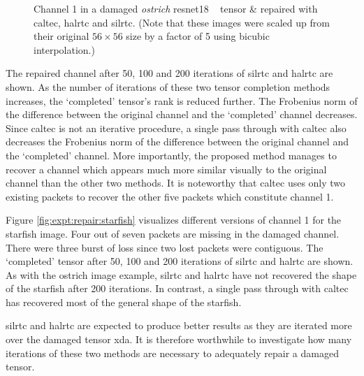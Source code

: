 \begin{figure}[H]
\caption[Channel 1 visualization in a damaged ostrich image ResNet18 tensor]{Channel 1 in a damaged \textit{ostrich} \gls{resnet18} \addone~ tensor \& repaired with \gls{caltec}, \gls{halrtc} and \gls{silrtc}. (Note that these images were scaled up from their original $56 \times 56$ size by a factor of 5 using bicubic interpolation.)}
	\label{fig:expt:repair:ostrich}
\end{figure}

The repaired channel after 50, 100 and 200 iterations of \gls{silrtc} and \gls{halrtc} are shown. As the number of iterations of these two tensor completion methods increases, the `completed' tensor's rank is reduced further. The Frobenius norm of the difference between the original channel and the `completed' channel decreases. Since \gls{caltec} is not an iterative procedure, a single pass through with \gls{caltec} also decreases the Frobenius norm of the difference between the original channel and the `completed' channel. More importantly, the proposed method manages to recover a channel which appears much more similar visually to the original channel than the other two methods. It is noteworthy that \gls{caltec} uses only two existing packets to recover the other five packets which constitute channel 1.

Figure \ref{fig:expt:repair:starfish} visualizes different versions of channel 1 for the starfish image. Four out of seven packets are missing in the damaged channel. There were three burst of loss since two lost packets were contiguous. The `completed' tensor after 50, 100 and 200 iterations of \gls{silrtc} and \gls{halrtc} are shown. As with the ostrich image example, \gls{silrtc} and \gls{halrtc} have not recovered the shape of the starfish after 200 iterations. In contrast, a single pass through with \gls{caltec} has recovered most of the general shape of the starfish.

\gls{silrtc} and \gls{halrtc} are expected to produce better results as they are iterated more over the damaged tensor \gls{xda}. It is therefore worthwhile to investigate how many iterations of these two methods are necessary to adequately repair a damaged tensor.

